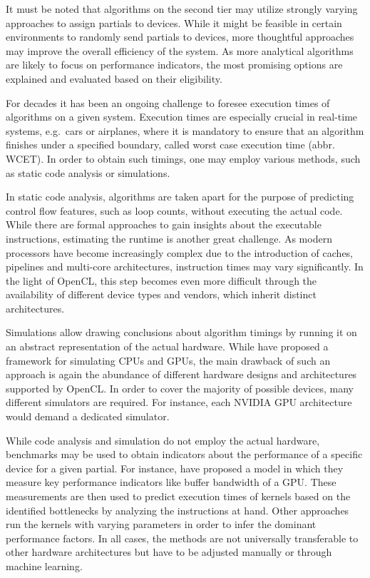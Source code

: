 It must be noted that algorithms on the second tier may utilize strongly varying approaches to assign partials to devices. While it might be feasible in certain environments to randomly send partials to devices, more thoughtful approaches may improve the overall efficiency of the system. As more analytical algorithms are likely to focus on performance indicators, the most promising options are explained and evaluated based on their eligibility.

For decades it has been an ongoing challenge to foresee execution times of algorithms on a given system. Execution times are especially crucial in real-time systems, e.g.~cars or airplanes, where it is mandatory to ensure that an algorithm finishes under a specified boundary, called worst case execution time (abbr. WCET). In order to obtain such timings, one may employ various methods, such as static code analysis or simulations\cite{wcet}.

In static code analysis, algorithms are taken apart for the purpose of predicting control flow features, such as loop counts, without executing the actual code\cite{loopbound}\cite{sweet}. While there are formal approaches to gain insights about the executable instructions, estimating the runtime is another great challenge. As modern processors have become increasingly complex due to the introduction of caches, pipelines and multi-core architectures, instruction times may vary significantly\cite{wcet}. In the light of OpenCL, this step becomes even more difficult through the availability of different device types and vendors, which inherit distinct architectures.

Simulations allow drawing conclusions about algorithm timings by running it on an abstract representation of the actual hardware\cite{wcet}. While \citeauthor{multi2sim} have proposed a framework for simulating CPUs and GPUs\cite{multi2sim}, the main drawback of such an approach is again the abundance of different hardware designs and architectures supported by OpenCL. In order to cover the majority of possible devices, many different simulators are required. For instance, each NVIDIA GPU architecture would demand a dedicated simulator.

While code analysis and simulation do not employ the actual hardware, benchmarks may be used to obtain indicators about the performance of a specific device for a given partial. For instance, \citeauthor{quantitative_performance} have proposed a model in which they measure key performance indicators like buffer bandwidth of a GPU\cite{quantitative_performance}. These measurements are then used to predict execution times of kernels based on the identified bottlenecks by analyzing the instructions at hand. Other approaches run the kernels with varying parameters in order to infer the dominant performance factors\cite{gpgpu_performance}. In all cases, the methods are not universally transferable to other hardware architectures but have to be adjusted manually or through machine learning.

